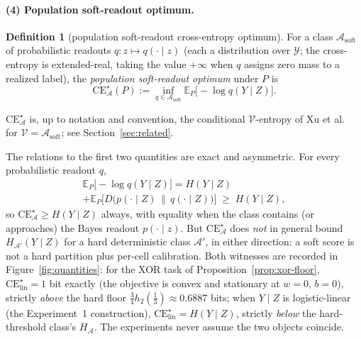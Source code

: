 \documentclass[twocolumn,10pt]{article}
\theoremstyle{definition}
\newtheorem{definition}[theorem]{Definition}
\theoremstyle{remark}
\newcommand{\E}{\mathbb{E}}
\newcommand{\cA}{\mathcal{A}}
\newcommand{\cY}{\mathcal{Y}}
\newcommand{\hb}{h_2}
\newcommand{\CE}{\mathrm{CE}}
\begin{document}
\paragraph{(4) Population soft-readout optimum.}

\begin{definition}[population soft-readout cross-entropy optimum]
\label{def:cestar}
For a class $\cA_{\mathrm{soft}}$ of probabilistic readouts
$q : z \mapsto q(\cdot \mid z)$ (each a distribution over $\cY$; the
cross-entropy is extended-real, taking the value $+\infty$ when $q$
assigns zero mass to a realized label), the
\emph{population soft-readout optimum} under $P$ is
\[
\CE^{\star}_{\cA}(P) := \inf_{q \in \cA_{\mathrm{soft}}}
\E_P\big[-\log q(Y \mid Z)\big].
\]
\end{definition}

$\CE^{\star}_{\cA}$ is, up to notation and convention, the conditional
$\mathcal{V}$-entropy of Xu et al.~\cite{xuvinfo} for
$\mathcal{V} = \cA_{\mathrm{soft}}$; see
Section~\ref{sec:related}.

The relations to the first two quantities are exact and asymmetric. For
every probabilistic readout $q$,
\begin{multline*}
\E_P\big[-\log q(Y \mid Z)\big]
= H(Y \mid Z) \\
+ \E_P\big[D\big(p(\cdot \mid Z) \,\big\|\,
q(\cdot \mid Z)\big)\big] \;\ge\; H(Y \mid Z),
\end{multline*}
so $\CE^{\star}_{\cA} \ge H(Y \mid Z)$ always, with equality when the
class contains (or approaches) the Bayes readout $p(\cdot \mid z)$. But
$\CE^{\star}_{\cA}$ does \emph{not} in general bound
$H_{\cA'}(Y \mid Z)$ for a hard deterministic class $\cA'$, in either
direction: a soft score is not a hard partition plus per-cell
calibration. Both witnesses are recorded in
Figure~\ref{fig:quantities}: for the XOR task of
Proposition~\ref{prop:xor-floor}, $\CE^{\star}_{\mathrm{lin}} = 1$ bit
exactly (the objective is convex and stationary at $w = 0$, $b = 0$),
strictly \emph{above} the hard floor
$\tfrac34 \hb(\tfrac13) \approx 0.6887$ bits; when $Y \mid Z$ is
logistic-linear (the Experiment~1 construction),
$\CE^{\star}_{\mathrm{lin}} = H(Y \mid Z)$, strictly \emph{below} the
hard-threshold class's $H_{\cA}$. The experiments never assume the
two objects coincide.
\end{document}
